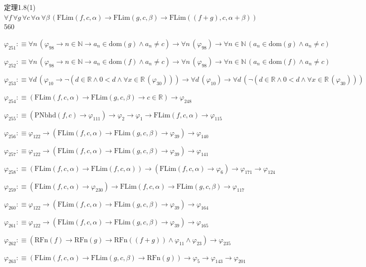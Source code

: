\begin{fullproof}{定理1.8(1)}{$\forall f\,\forall g\,\forall c\,\forall \alpha\,\forall \beta\,(\mathrm{FLim}(f,c,\alpha) \to \mathrm{FLim}(g,c,\beta) \to \mathrm{FLim}((f + g),c,\alpha + \beta))$}{560}
\begin{abbrevlist}
\item $\varphi_{251} :\equiv \forall n\,(\varphi_{98} \to n \in \mathbb{N} \to a_{n} \in \mathrm{dom}(g) \land a_{n} \neq c) \to \forall n\,(\varphi_{98}) \to \forall n \in \mathbb{N}\,(a_{n} \in \mathrm{dom}(g) \land a_{n} \neq c)$
\item $\varphi_{252} :\equiv \forall n\,(\varphi_{98} \to n \in \mathbb{N} \to a_{n} \in \mathrm{dom}(f) \land a_{n} \neq c) \to \forall n\,(\varphi_{98}) \to \forall n \in \mathbb{N}\,(a_{n} \in \mathrm{dom}(f) \land a_{n} \neq c)$
\item $\varphi_{253} :\equiv \forall d\,(\varphi_{10} \to \neg (d \in \mathbb{R} \land 0 < d \land \forall x \in \mathbb{R}\,(\varphi_{30}))) \to \forall d\,(\varphi_{10}) \to \forall d\,(\neg (d \in \mathbb{R} \land 0 < d \land \forall x \in \mathbb{R}\,(\varphi_{30})))$
\item $\varphi_{254} :\equiv (\mathrm{FLim}(f,c,\alpha) \to \mathrm{FLim}(g,c,\beta) \to c \in \mathbb{R}) \to \varphi_{248}$
\item $\varphi_{255} :\equiv (\mathrm{PNbhd}(f,c) \to \varphi_{111}) \to \varphi_{2} \to \varphi_{1} \to \mathrm{FLim}(f,c,\alpha) \to \varphi_{115}$
\item $\varphi_{256} :\equiv \varphi_{122} \to (\mathrm{FLim}(f,c,\alpha) \to \mathrm{FLim}(g,c,\beta) \to \varphi_{39}) \to \varphi_{140}$
\item $\varphi_{257} :\equiv \varphi_{122} \to (\mathrm{FLim}(f,c,\alpha) \to \mathrm{FLim}(g,c,\beta) \to \varphi_{39}) \to \varphi_{141}$
\item $\varphi_{258} :\equiv (\mathrm{FLim}(f,c,\alpha) \to \mathrm{FLim}(f,c,\alpha)) \to (\mathrm{FLim}(f,c,\alpha) \to \varphi_{6}) \to \varphi_{171} \to \varphi_{124}$
\item $\varphi_{259} :\equiv (\mathrm{FLim}(f,c,\alpha) \to \varphi_{230}) \to \mathrm{FLim}(f,c,\alpha) \to \mathrm{FLim}(g,c,\beta) \to \varphi_{117}$
\item $\varphi_{260} :\equiv \varphi_{122} \to (\mathrm{FLim}(f,c,\alpha) \to \mathrm{FLim}(g,c,\beta) \to \varphi_{39}) \to \varphi_{164}$
\item $\varphi_{261} :\equiv \varphi_{122} \to (\mathrm{FLim}(f,c,\alpha) \to \mathrm{FLim}(g,c,\beta) \to \varphi_{39}) \to \varphi_{165}$
\item $\varphi_{262} :\equiv (\mathrm{RFn}(f) \to \mathrm{RFn}(g) \to \mathrm{RFn}((f + g)) \land \varphi_{11} \land \varphi_{23}) \to \varphi_{235}$
\item $\varphi_{263} :\equiv (\mathrm{FLim}(f,c,\alpha) \to \mathrm{FLim}(g,c,\beta) \to \mathrm{RFn}(g)) \to \varphi_{5} \to \varphi_{143} \to \varphi_{201}$

\end{abbrevlist}
\end{fullproof}
